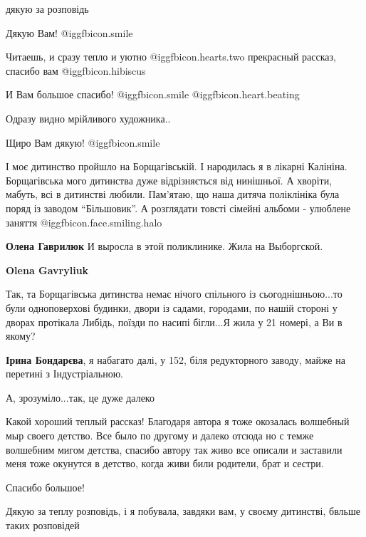 \begin{itemize}
дякую за розповідь

Дякую Вам! @igg{fbicon.smile} 


Читаешь, и сразу тепло и уютно  @igg{fbicon.hearts.two}  прекрасный рассказ,
спасибо вам  @igg{fbicon.hibiscus} 

И Вам большое спасибо! @igg{fbicon.smile}  @igg{fbicon.heart.beating} 

Одразу видно мрійливого художника..

Щиро Вам дякую! @igg{fbicon.smile} 


І моє дитинство пройшло на Борщагівській. І народилась я в лікарні Калініна.
Борщагівська мого дитинства дуже відрізняється від нинішньої. А хворіти,
мабуть, всі в дитинстві любили. Пам'ятаю, що наша дитяча поліклініка була поряд
із заводом \enquote{Більшовик}. А розглядати товсті сімейні альбоми - улюблене
заняття @igg{fbicon.face.smiling.halo} 

\begin{itemize} %
\textbf{Олена Гаврилюк} И выросла в этой поликлинике. Жила на Выборгской.

\textbf{Olena Gavryliuk} 

Так, та Борщагівська дитинства немає нічого спільного із сьогоднішньою...то
були одноповерхові будинки, двори із садами, городами, по нашій стороні у
дворах протікала Либідь, поїзди по насипі бігли...Я жила у 21 номері, а Ви в
якому?


\textbf{Ірина Бондарєва}, я набагато далі, у 152, біля редукторного заводу, майже на перетині з Індустріальною.

А, зрозуміло...так, це дуже далеко
\end{itemize} %


Какой хороший теплый рассказ! Благодаря автора я тоже окозалась волшебный мыр
своего детство. Все было по другому и далеко отсюда но с темже волшебним мигом
детства, спасибо автору так живо все описали и заставили меня тоже окунутся в
детство, когда живи били родители, брат и сестри.


Спасибо большое!

Дякую за теплу розповідь, і я побувала, завдяки вам, у своєму дитинстві, бвльше таких розповідей


\end{itemize}
